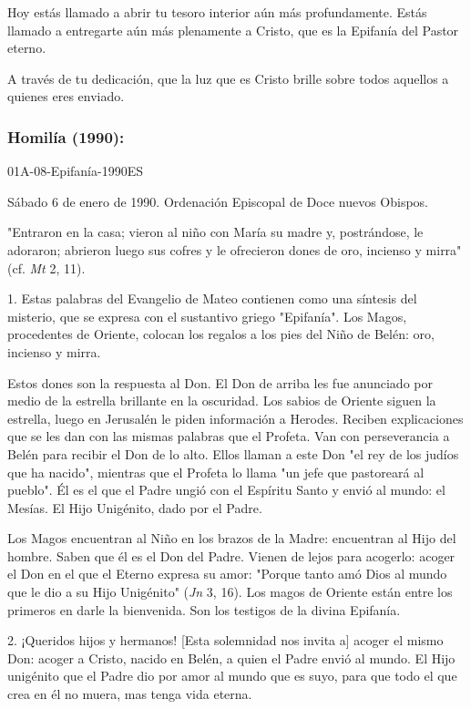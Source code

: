 Hoy estás llamado a abrir tu tesoro interior aún más profundamente.
Estás llamado a entregarte aún más plenamente a Cristo, que es la
Epifanía del Pastor eterno.

A través de tu dedicación, que la luz que es Cristo brille sobre todos
aquellos a quienes eres enviado.

\subsubsection{Homilía (1990): }
01A-08-Epifanía-1990ES

Sábado 6 de enero de 1990. Ordenación Episcopal de Doce nuevos Obispos.

"Entraron en la casa; vieron al niño con María su madre y, postrándose,
le adoraron; abrieron luego sus cofres y le ofrecieron dones de oro,
incienso y mirra" (cf. \emph{Mt} 2, 11).

1. Estas palabras del Evangelio de Mateo contienen como una síntesis del
misterio, que se expresa con el sustantivo griego "Epifanía". Los Magos,
procedentes de Oriente, colocan los regalos a los pies del Niño de
Belén: oro, incienso y mirra.

Estos dones son la respuesta al Don. El Don de arriba les fue anunciado
por medio de la estrella brillante en la oscuridad. Los sabios de
Oriente siguen la estrella, luego en Jerusalén le piden información a
Herodes. Reciben explicaciones que se les dan con las mismas palabras
que el Profeta. Van con perseverancia a Belén para recibir el Don de lo
alto. Ellos llaman a este Don "el rey de los judíos que ha nacido",
mientras que el Profeta lo llama "un jefe que pastoreará al pueblo". Él
es el que el Padre ungió con el Espíritu Santo y envió al mundo: el
Mesías. El Hijo Unigénito, dado por el Padre.

Los Magos encuentran al Niño en los brazos de la Madre: encuentran al
Hijo del hombre. Saben que él es el Don del Padre. Vienen de lejos para
acogerlo: acoger el Don en el que el Eterno expresa su amor: "Porque
tanto amó Dios al mundo que le dio a su Hijo Unigénito" (\emph{Jn} 3,
16). Los magos de Oriente están entre los primeros en darle la
bienvenida. Son los testigos de la divina Epifanía.

2. ¡Queridos hijos y hermanos! {[}Esta solemnidad nos invita a{]} acoger
el mismo Don: acoger a Cristo, nacido en Belén, a quien el Padre envió
al mundo. El Hijo unigénito que el Padre dio por amor al mundo que es
suyo, para que todo el que crea en él no muera, mas tenga vida eterna.

